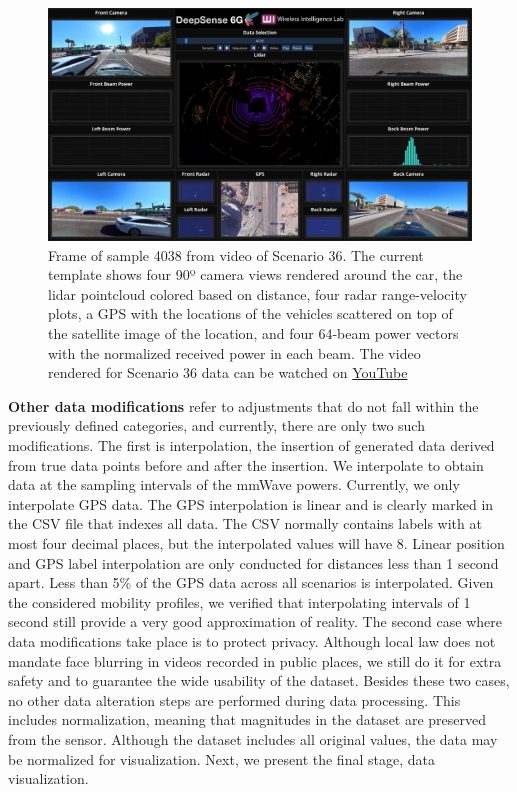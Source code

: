 \documentclass[10pt,comsoc]{IEEEtran}
\begin{document}
\begin{figure}[t]
	\centering
	\includegraphics[width=2\columnwidth]{data_vis_v2}
	\caption{Frame of sample 4038 from video of Scenario 36. The current template shows four 90º camera views rendered around the car, the lidar pointcloud colored based on distance, four radar range-velocity plots, a GPS with the locations of the vehicles scattered on top of the satellite image of the location, and four 64-beam power vectors with the normalized received power in each beam. The video rendered for Scenario 36 data can be watched on \href{https://www.youtube.com/watch?v=9RyZnZI7kv0&ab_channel=DeepSense6G}{YouTube}}
	\label{fig:data_visualization}
\end{figure}

\textbf{Other data modifications} refer to adjustments that do not fall within the previously defined categories, and currently, there are only two such modifications. The first is interpolation, the insertion of generated data derived from true data points before and after the insertion. We interpolate to obtain data at the sampling intervals of the mmWave powers. Currently, we only interpolate GPS data. The GPS interpolation is linear and is clearly marked in the CSV file that indexes all data. The CSV normally contains labels with at most four decimal places, but the interpolated values will have 8. Linear position and GPS label interpolation are only conducted for distances less than 1 second apart. Less than 5\% of the GPS data across all scenarios is interpolated. Given the considered mobility profiles, we verified that interpolating intervals of 1 second still provide a very good approximation of reality. The second case where data modifications take place is to protect privacy. Although local law does not mandate face blurring in videos recorded in public places, we still do it for extra safety and to guarantee the wide usability of the dataset. Besides these two cases, no other data alteration steps are performed during data processing. This includes normalization, meaning that magnitudes in the dataset are preserved from the sensor. Although the dataset includes all original values, the data may be normalized for visualization. Next, we present the final stage, data visualization.
\end{document}
